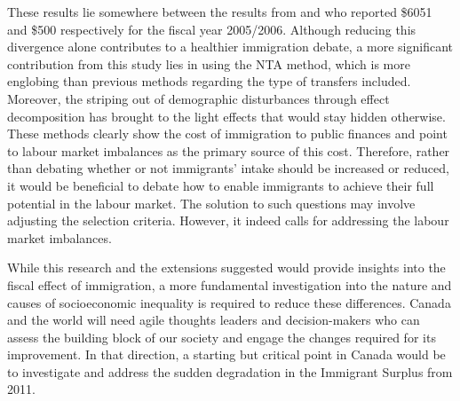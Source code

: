 \vspace{0.7em}\par
These results lie somewhere between the results from \citet{Grubel:2012wo} and \citet{Javdani:2013gu} who reported \$\num{6051} and \$500 respectively for the fiscal year 2005/2006.
Although reducing this divergence alone contributes to a healthier immigration debate, a more significant contribution from this study lies in using the NTA method, which is more englobing than previous methods regarding the type of transfers included.
Moreover, the striping out of demographic disturbances through effect decomposition has brought to the light effects that would stay hidden otherwise.
These methods clearly show the cost of immigration to public finances and point to labour market imbalances as the primary source of this cost.
Therefore, rather than debating whether or not immigrants' intake should be increased or reduced, it would be beneficial to debate how to enable immigrants to achieve their full potential in the labour market.
The solution to such questions may involve adjusting the selection criteria. However, it indeed calls for addressing the labour market imbalances.

\vspace{0.7em}\par
While this research and the extensions suggested would provide insights into the fiscal effect of immigration, a more fundamental investigation into the nature and causes of socioeconomic inequality is required to reduce these differences.
Canada and the world will need agile thoughts leaders and decision-makers who can assess the building block of our society and engage the changes required for its improvement.
In that direction, a starting but critical point in Canada would be to investigate and address the sudden degradation in the Immigrant Surplus from 2011.